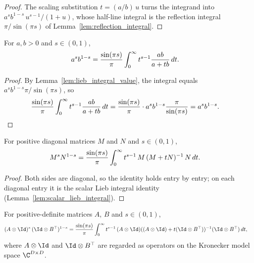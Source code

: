 \begin{proof}\leanok
    The scaling substitution $t=(a/b)\,u$ turns the integrand into
    $a^s b^{1-s}\,u^{s-1}/(1+u)$, whose half-line integral is the reflection
    integral $\pi/\sin(\pi s)$ of Lemma~\ref{lem:reflection_integral}.
\end{proof}

\begin{lemma}\label{lem:scalar_lieb_integral}
    \leanok
    For $a,b>0$ and $s\in(0,1)$,
    \begin{align}
        a^s b^{1-s}
        &= \frac{\sin(\pi s)}{\pi}
            \int_0^\infty t^{s-1} \frac{ab}{a+tb}\,dt.
        \notag
    \end{align}
\end{lemma}

\begin{proof}\leanok
    By Lemma~\ref{lem:lieb_integral_value}, the integral equals
    $a^s b^{1-s} \pi/\sin(\pi s)$, so
    \begin{align}
        \frac{\sin(\pi s)}{\pi}
        \int_0^\infty t^{s-1} \frac{ab}{a+tb}\,dt
        &= \frac{\sin(\pi s)}{\pi}\cdot
           a^s b^{1-s} \frac{\pi}{\sin(\pi s)}
         = a^s b^{1-s}.
        \notag
    \end{align}
\end{proof}

\begin{lemma}\label{lem:diagonal_lieb_integral}
    \leanok
    For positive diagonal matrices $M$ and $N$ and $s\in(0,1)$,
    \begin{align}
        M^s N^{1-s}
        &= \frac{\sin(\pi s)}{\pi}
           \int_0^\infty t^{s-1}\,M\,(M+tN)^{-1}\,N\,dt.
        \notag
    \end{align}
\end{lemma}

\begin{proof}\leanok
    Both sides are diagonal, so the identity holds entry by entry; on each
    diagonal entry it is the scalar Lieb integral identity
    (Lemma~\ref{lem:scalar_lieb_integral}).
\end{proof}

\begin{lemma}\label{lem:op_lieb_integral_rep}
    \leanok
    For positive-definite matrices $A$, $B$ and $s\in(0,1)$,
    \begin{align}
        (A\otimes\Id)^s\,(\Id\otimes B^\top)^{1-s}
        &=
        \frac{\sin(\pi s)}{\pi}
        \int_0^\infty t^{s-1}\,(A\otimes\Id)
        ((A\otimes\Id)+t(\Id\otimes B^\top))^{-1}
        (\Id\otimes B^\top)\,dt,
        \label{eq:operator_convexity_integral_rep}
    \end{align}
    where $A\otimes\Id$ and $\Id\otimes B^\top$ are regarded as operators on
    the Kronecker model space $\C^{D\times D}$.
\end{lemma}

